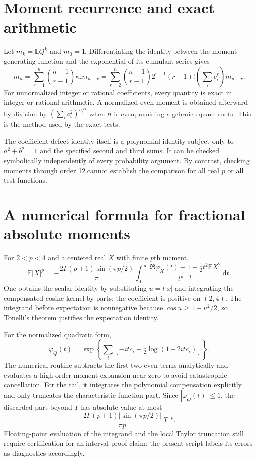 \documentclass[11pt]{article}
\numberwithin{equation}{section}
\theoremstyle{definition}
\theoremstyle{remark}
\newcommand{\E}{\mathbb E}
\newcommand{\dd}{\,\mathrm d}
\begin{document}
\appendix
\section{Moment recurrence and exact arithmetic}
\label{app:moments}

Let $m_k=\E Q^k$ and $m_0=1$. Differentiating the identity between the moment-generating function and the exponential of its cumulant series gives
\begin{equation}\label{eq:recurrence}
m_n=\sum_{r=1}^n\binom{n-1}{r-1}\kappa_r m_{n-r}
=\sum_{r=2}^n\binom{n-1}{r-1}
2^{r-1}(r-1)!\left(\sum_i c_i^r\right)m_{n-r}.
\end{equation}
For unnormalized integer or rational coefficients, every quantity is exact in integer or rational arithmetic. A normalized even moment is obtained afterward by division by $(\sum_i c_i^2)^{n/2}$ when $n$ is even, avoiding algebraic square roots. This is the method used by the exact tests.

The coefficient-defect identity itself is a polynomial identity subject only to $a^2+b^2=1$ and the specified second and third sums. It can be checked symbolically independently of every probability argument. By contrast, checking moments through order 12 cannot establish the comparison for all real $p$ or all test functions.

\section{A numerical formula for fractional absolute moments}
\label{app:fractional}

For $2<p<4$ and a centered real $X$ with finite $p$th moment,
\begin{equation}\label{eq:fractional}
\E|X|^p
=-\frac{2\Gamma(p+1)\sin(\pi p/2)}{\pi}
\int_0^\infty
\frac{\Re\varphi_X(t)-1+\tfrac12t^2\E X^2}{t^{p+1}}\dd t.
\end{equation}
One obtains the scalar identity by substituting $u=t|x|$ and integrating the compensated cosine kernel by parts; the coefficient is positive on $(2,4)$. The integrand before expectation is nonnegative because $\cos u\geq1-u^2/2$, so Tonelli's theorem justifies the expectation identity.

For the normalized quadratic form,
\begin{equation}\label{eq:charfun}
\varphi_Q(t)=\exp\left\{\sum_i\left[-itc_i-\tfrac12\log(1-2itc_i)\right]\right\}.
\end{equation}
The numerical routine subtracts the first two even terms analytically and evaluates a high-order moment expansion near zero to avoid catastrophic cancellation. For the tail, it integrates the polynomial compensation explicitly and only truncates the characteristic-function part. Since $|\varphi_Q(t)|\leq1$, the discarded part beyond $T$ has absolute value at most
\[
\frac{2\Gamma(p+1)|\sin(\pi p/2)|}{\pi p}\,T^{-p}.
\]
Floating-point evaluation of the integrand and the local Taylor truncation still require certification for an interval-proof claim; the present script labels its errors as diagnostics accordingly.

\clearpage


\end{document}
